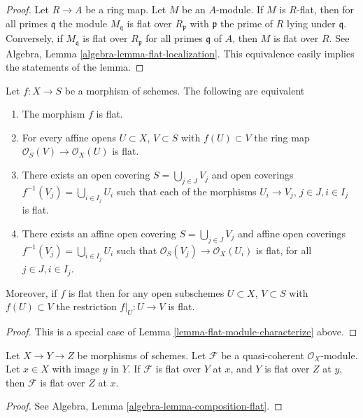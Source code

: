 \begin{proof}
Let $R \to A$ be a ring map. Let $M$ be an $A$-module.
If $M$ is $R$-flat, then for all primes
$\mathfrak q$ the module $M_{\mathfrak q}$ is flat over $R_{\mathfrak p}$
with $\mathfrak p$ the prime of $R$ lying under $\mathfrak q$. Conversely, if
$M_{\mathfrak q}$ is flat over $R_{\mathfrak p}$ for all primes $\mathfrak q$
of $A$, then $M$ is flat over $R$. See
Algebra, Lemma \ref{algebra-lemma-flat-localization}.
This equivalence easily implies the statements of the lemma.
\end{proof}

\begin{lemma}
\label{lemma-flat-characterize}
Let $f : X \to S$ be a morphism of schemes.
The following are equivalent
\begin{enumerate}
\item The morphism $f$ is flat.
\item For every affine opens $U \subset X$, $V \subset S$
with $f(U) \subset V$ the ring map
$\mathcal{O}_S(V) \to \mathcal{O}_X(U)$ is flat.
\item There exists an open covering $S = \bigcup_{j \in J} V_j$
and open coverings $f^{-1}(V_j) = \bigcup_{i \in I_j} U_i$ such
that each of the morphisms $U_i \to V_j$, $j\in J, i\in I_j$
is flat.
\item There exists an affine open covering $S = \bigcup_{j \in J} V_j$
and affine open coverings $f^{-1}(V_j) = \bigcup_{i \in I_j} U_i$ such
that $\mathcal{O}_S(V_j) \to \mathcal{O}_X(U_i)$ is flat, for all
$j\in J, i\in I_j$.
\end{enumerate}
Moreover, if $f$ is flat then for
any open subschemes $U \subset X$, $V \subset S$ with $f(U) \subset V$
the restriction $f|_U : U \to V$ is flat.
\end{lemma}

\begin{proof}
This is a special case of Lemma \ref{lemma-flat-module-characterize}
above.
\end{proof}

\begin{lemma}
\label{lemma-composition-module-flat}
Let $X \to Y \to Z$ be morphisms of schemes. Let $\mathcal{F}$ be a
quasi-coherent $\mathcal{O}_X$-module. Let $x \in X$ with image $y$ in $Y$.
If $\mathcal{F}$ is flat over $Y$ at $x$, and $Y$ is flat over $Z$ at
$y$, then $\mathcal{F}$ is flat over $Z$ at $x$.
\end{lemma}

\begin{proof}
See Algebra, Lemma \ref{algebra-lemma-composition-flat}.
\end{proof}

